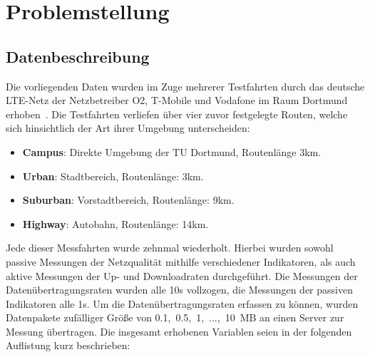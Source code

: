 \section{Problemstellung}

\subsection{Datenbeschreibung}

Die vorliegenden Daten wurden im Zuge mehrerer Testfahrten durch das deutsche LTE-Netz der Netzbetreiber O2,
T-Mobile und Vodafone im Raum Dortmund erhoben~\cite{IEEE}.
Die Testfahrten verliefen \"uber vier zuvor festgelegte Routen, welche sich hinsichtlich der Art ihrer Umgebung unterscheiden:
\begin{itemize}
    \item \textbf{Campus}: Direkte Umgebung der TU Dortmund, Routenl\"ange 3km.
    \item \textbf{Urban}: Stadtbereich, Routenl\"ange: 3km.
    \item \textbf{Suburban}: Vorstadtbereich, Routenl\"ange: 9km.
    \item \textbf{Highway}: Autobahn, Routenl\"ange: 14km.
\end{itemize}
Jede dieser Messfahrten wurde zehnmal wiederholt.
Hierbei wurden sowohl passive Messungen der Netzqualit\"at mithilfe verschiedener Indikatoren, als auch aktive
Messungen der Up- und Downloadraten durchgef\"uhrt.
Die Messungen der Da\-ten\-\"uber\-tra\-gungs\-ra\-ten wurden alle 10s vollzogen, die Messungen der passiven Indikatoren alle 1s.
Um die Da\-ten\-\"uber\-tra\-gungs\-ra\-ten erfassen zu k\"onnen,
wurden Datenpakete zuf\"alliger Gr\"o{\ss}e von \mbox{0.1, 0.5, 1, ..., 10 MB} an einen Server zur Messung \"ubertragen.
Die insgesamt erhobenen Variablen seien in der folgenden Auflistung kurz beschrieben:
